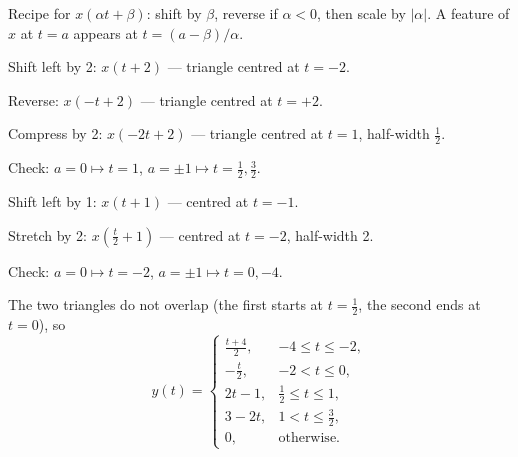 \begin{solution}
Recipe for $x(\alpha t+\beta)$: shift by $\beta$, reverse if $\alpha<0$, then scale by $|\alpha|$. A feature of $x$ at $t=a$ appears at $t=(a-\beta)/\alpha$.

\begin{steps}
\item Shift left by 2: $x(t+2)$ --- triangle centred at $t=-2$.
\item Reverse: $x(-t+2)$ --- triangle centred at $t=+2$.
\item Compress by 2: $x(-2t+2)$ --- triangle centred at $t=1$, half-width $\tfrac12$.
\end{steps}
Check: $a=0\mapsto t=1$, $a=\pm1\mapsto t=\tfrac12,\tfrac32$.

\begin{steps}
\item Shift left by 1: $x(t+1)$ --- centred at $t=-1$.
\item Stretch by 2: $x(\tfrac t2+1)$ --- centred at $t=-2$, half-width 2.
\end{steps}
Check: $a=0\mapsto t=-2$, $a=\pm1\mapsto t=0,-4$.

\begin{center}
\hspace{2mm}
\hspace{2mm}
\end{center}
The two triangles do not overlap (the first starts at $t=\frac12$, the second ends at $t=0$), so
\[
y(t)=\begin{cases}\frac{t+4}{2},&-4\le t\le-2,\\[2pt]-\frac t2,&-2<t\le0,\\[2pt]2t-1,&\frac12\le t\le1,\\[2pt]3-2t,&1<t\le\frac32,\\[2pt]0,&\text{otherwise.}\end{cases}
\]
\end{solution}

